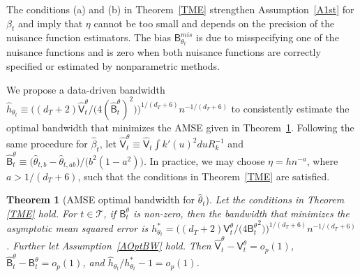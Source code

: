 \documentclass[lettersize, 12pt]{article}
\newtheorem{theorem}{Theorem}
\newtheorem{remark}{Remark}
\begin{document}
The conditions (a) and (b) in Theorem~\ref{TME} strengthen Assumption~\ref{A1st} for $\beta_t$ and 
imply that $\eta$ cannot be too small and depends on the precision of the nuisance function estimators.
The bias $\mathsf{B}_{\theta_t}^{mis}$ is due to misspecifying one of the nuisance functions 
and is zero when both nuisance functions are correctly specified or estimated by nonparametric methods.

We propose a data-driven bandwidth $\hat h_{\theta_t} \equiv  
\big((d_T+2) \hat{\mathsf{V}}_t^\theta\big/\big(4(\hat{\mathsf{B}}_t^\theta)^2\big)\big)^{1/(d_T+6)} n^{-1/(d_T+6)}$
to consistently estimate the optimal bandwidth that minimizes the AMSE given in Theorem~\ref{Tbwtheta}.
Following the same procedure for $\hat\beta_t$, 
let
$\hat{\mathsf{V}}_t^\theta \equiv 
\hat{\mathsf{V}}_t \int k'(u)^2du R_k^{-1}$
and 
$\hat{\mathsf{B}}^\theta_t  \equiv \big(\hat\theta_{t,b}
- \hat\theta_{t,ab}\big)/\big(b^2 (1-a^2)\big)$.
In practice, we may choose $\eta = h n^{-a}$, where $a > 1/(d_T + 6)$, such that the conditions in Theorem~\ref{TME} are satisfied.


\begin{theorem}[AMSE optimal bandwidth for $\hat\theta_t$]
Let the conditions in Theorem \ref{TME} hold.
For $t\in\mathcal{T}$, if $\mathsf{B}_t^\theta$ is non-zero, then the bandwidth that minimizes the asymptotic mean squared error is 
$h^\ast_{\theta_t} =  \big((d_T+2) \mathsf{V}_t^\theta\big/\big(4{\mathsf{B}_t^\theta}^2\big)\big)^{1/(d_T+6)} n^{-1/(d_T+6)}$.
Further let Assumption~\ref{AOptBW} hold.
Then $\hat{\mathsf{V}}_t^\theta - \mathsf{V}_t^\theta = o_p(1)$, $\hat{\mathsf{B}}^\theta_t - \mathsf{B}_t^\theta = o_p(1)$, and $\hat h_{\theta_t}/h_{\theta_t}^\ast -1 = o_p(1)$.
\label{Tbwtheta}
\end{theorem}



\end{document}
